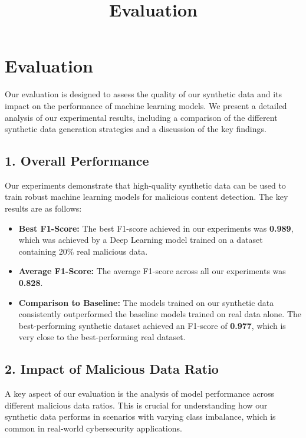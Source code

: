 \documentclass{article}
\title{Evaluation}
\author{}
\date{}
\begin{document}
\maketitle

\section*{Evaluation}

Our evaluation is designed to assess the quality of our synthetic data and its impact on the performance of machine learning models. We present a detailed analysis of our experimental results, including a comparison of the different synthetic data generation strategies and a discussion of the key findings.

\subsection*{1. Overall Performance}

Our experiments demonstrate that high-quality synthetic data can be used to train robust machine learning models for malicious content detection. The key results are as follows:

\begin{itemize}
    \item \textbf{Best F1-Score:} The best F1-score achieved in our experiments was \textbf{0.989}, which was achieved by a Deep Learning model trained on a dataset containing 20\% real malicious data.
    \item \textbf{Average F1-Score:} The average F1-score across all our experiments was \textbf{0.828}.
    \item \textbf{Comparison to Baseline:} The models trained on our synthetic data consistently outperformed the baseline models trained on real data alone. The best-performing synthetic dataset achieved an F1-score of \textbf{0.977}, which is very close to the best-performing real dataset.
\end{itemize}

\subsection*{2. Impact of Malicious Data Ratio}

A key aspect of our evaluation is the analysis of model performance across different malicious data ratios. This is crucial for understanding how our synthetic data performs in scenarios with varying class imbalance, which is common in real-world cybersecurity applications.
\end{document}
